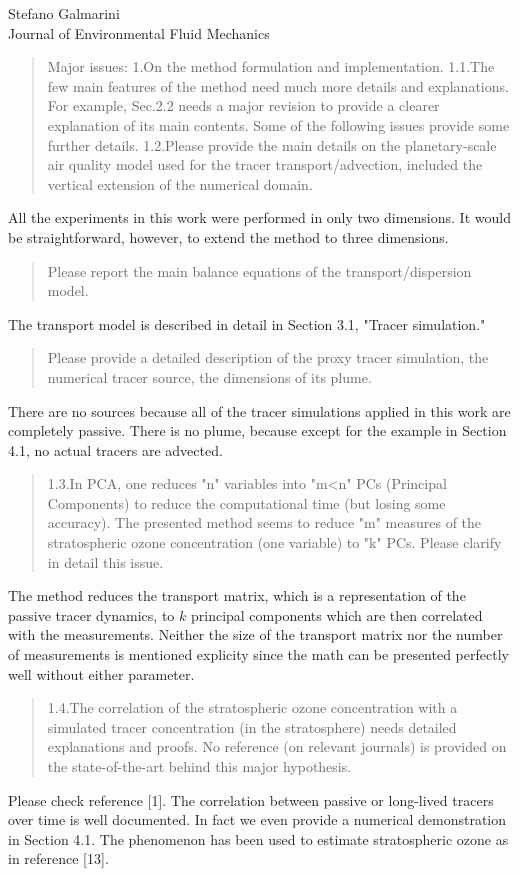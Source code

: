 \documentclass{letter}
\begin{document}
\begin{letter}{Stefano Galmarini\\
Journal of Environmental Fluid Mechanics}
\begin{quote}
Major issues:
1.On the method formulation and implementation.
1.1.The few main features of the method need much more details and explanations. For example, Sec.2.2 needs a major revision to provide a clearer explanation of its main contents. Some of the following issues provide some further details.
1.2.Please provide the main details on the planetary-scale air quality model used for the tracer transport/advection, included the vertical extension of the numerical domain.
\end{quote}
All the experiments in this work were performed in only two dimensions.
It would be straightforward, however, to extend the method to three dimensions.
\begin{quote}
Please report the main balance equations of the transport/dispersion model.
\end{quote}
The transport model is described in detail in Section 3.1, "Tracer simulation."
\begin{quote}
Please provide a detailed description of the proxy tracer simulation, the numerical tracer source, the dimensions of its plume.
\end{quote}
There are no sources because all of the tracer simulations applied in this
work are completely passive. There is no plume, because except for the example
in Section 4.1, no actual tracers are advected.
\begin{quote}
1.3.In PCA, one reduces "n" variables into "m<n" PCs (Principal Components) to reduce the computational time (but losing some accuracy). The presented method seems to reduce "m" measures of the stratospheric ozone concentration (one variable) to "k" PCs. Please clarify in detail this issue.
\end{quote}
The method reduces the transport matrix, which is a representation of the passive
tracer dynamics, to $k$ principal components which are then correlated with the
measurements.
Neither the size of the transport matrix nor the number of measurements is
mentioned explicity since the math can be presented perfectly well without 
either parameter.
\begin{quote}
1.4.The correlation of the stratospheric ozone concentration with a simulated tracer concentration (in the stratosphere) needs detailed explanations and proofs. No reference (on relevant journals) is provided on the state-of-the-art behind this major hypothesis.
\end{quote}
Please check reference [1]. The correlation between passive or long-lived tracers over time is well documented. In fact we even provide a numerical demonstration in Section 4.1. The phenomenon has been used to estimate stratospheric ozone as in reference [13].

\end{letter}
\end{document}
